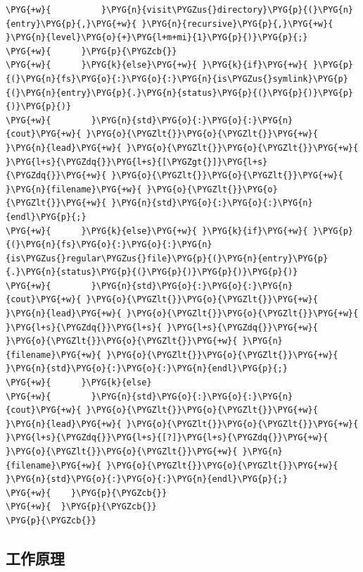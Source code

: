 \begin{itemize}
\begin{codeblockbg}
\begin{Verbatim}[commandchars=\\\{\},breaklines=true,breakanywhere=true,fontsize=\codefont,xleftmargin=17bp]
\PYG{+w}{          }\PYG{n}{visit\PYGZus{}directory}\PYG{p}{(}\PYG{n}{entry}\PYG{p}{,}\PYG{+w}{ }\PYG{n}{recursive}\PYG{p}{,}\PYG{+w}{ }\PYG{n}{level}\PYG{o}{+}\PYG{l+m+mi}{1}\PYG{p}{)}\PYG{p}{;}
\PYG{+w}{      }\PYG{p}{\PYGZcb{}}
\PYG{+w}{      }\PYG{k}{else}\PYG{+w}{ }\PYG{k}{if}\PYG{+w}{ }\PYG{p}{(}\PYG{n}{fs}\PYG{o}{:}\PYG{o}{:}\PYG{n}{is\PYGZus{}symlink}\PYG{p}{(}\PYG{n}{entry}\PYG{p}{.}\PYG{n}{status}\PYG{p}{(}\PYG{p}{)}\PYG{p}{)}\PYG{p}{)}
\PYG{+w}{        }\PYG{n}{std}\PYG{o}{:}\PYG{o}{:}\PYG{n}{cout}\PYG{+w}{ }\PYG{o}{\PYGZlt{}}\PYG{o}{\PYGZlt{}}\PYG{+w}{ }\PYG{n}{lead}\PYG{+w}{ }\PYG{o}{\PYGZlt{}}\PYG{o}{\PYGZlt{}}\PYG{+w}{ }\PYG{l+s}{\PYGZdq{}}\PYG{l+s}{[\PYGZgt{}]}\PYG{l+s}{\PYGZdq{}}\PYG{+w}{ }\PYG{o}{\PYGZlt{}}\PYG{o}{\PYGZlt{}}\PYG{+w}{ }\PYG{n}{filename}\PYG{+w}{ }\PYG{o}{\PYGZlt{}}\PYG{o}{\PYGZlt{}}\PYG{+w}{ }\PYG{n}{std}\PYG{o}{:}\PYG{o}{:}\PYG{n}{endl}\PYG{p}{;}
\PYG{+w}{      }\PYG{k}{else}\PYG{+w}{ }\PYG{k}{if}\PYG{+w}{ }\PYG{p}{(}\PYG{n}{fs}\PYG{o}{:}\PYG{o}{:}\PYG{n}{is\PYGZus{}regular\PYGZus{}file}\PYG{p}{(}\PYG{n}{entry}\PYG{p}{.}\PYG{n}{status}\PYG{p}{(}\PYG{p}{)}\PYG{p}{)}\PYG{p}{)}
\PYG{+w}{        }\PYG{n}{std}\PYG{o}{:}\PYG{o}{:}\PYG{n}{cout}\PYG{+w}{ }\PYG{o}{\PYGZlt{}}\PYG{o}{\PYGZlt{}}\PYG{+w}{ }\PYG{n}{lead}\PYG{+w}{ }\PYG{o}{\PYGZlt{}}\PYG{o}{\PYGZlt{}}\PYG{+w}{ }\PYG{l+s}{\PYGZdq{}}\PYG{l+s}{ }\PYG{l+s}{\PYGZdq{}}\PYG{+w}{ }\PYG{o}{\PYGZlt{}}\PYG{o}{\PYGZlt{}}\PYG{+w}{ }\PYG{n}{filename}\PYG{+w}{ }\PYG{o}{\PYGZlt{}}\PYG{o}{\PYGZlt{}}\PYG{+w}{ }\PYG{n}{std}\PYG{o}{:}\PYG{o}{:}\PYG{n}{endl}\PYG{p}{;}
\PYG{+w}{      }\PYG{k}{else}
\PYG{+w}{        }\PYG{n}{std}\PYG{o}{:}\PYG{o}{:}\PYG{n}{cout}\PYG{+w}{ }\PYG{o}{\PYGZlt{}}\PYG{o}{\PYGZlt{}}\PYG{+w}{ }\PYG{n}{lead}\PYG{+w}{ }\PYG{o}{\PYGZlt{}}\PYG{o}{\PYGZlt{}}\PYG{+w}{ }\PYG{l+s}{\PYGZdq{}}\PYG{l+s}{[?]}\PYG{l+s}{\PYGZdq{}}\PYG{+w}{ }\PYG{o}{\PYGZlt{}}\PYG{o}{\PYGZlt{}}\PYG{+w}{ }\PYG{n}{filename}\PYG{+w}{ }\PYG{o}{\PYGZlt{}}\PYG{o}{\PYGZlt{}}\PYG{+w}{ }\PYG{n}{std}\PYG{o}{:}\PYG{o}{:}\PYG{n}{endl}\PYG{p}{;}
\PYG{+w}{    }\PYG{p}{\PYGZcb{}}
\PYG{+w}{  }\PYG{p}{\PYGZcb{}}
\PYG{p}{\PYGZcb{}}
\end{Verbatim}
\end{codeblockbg}

\end{itemize}



\subsection{工作原理}


